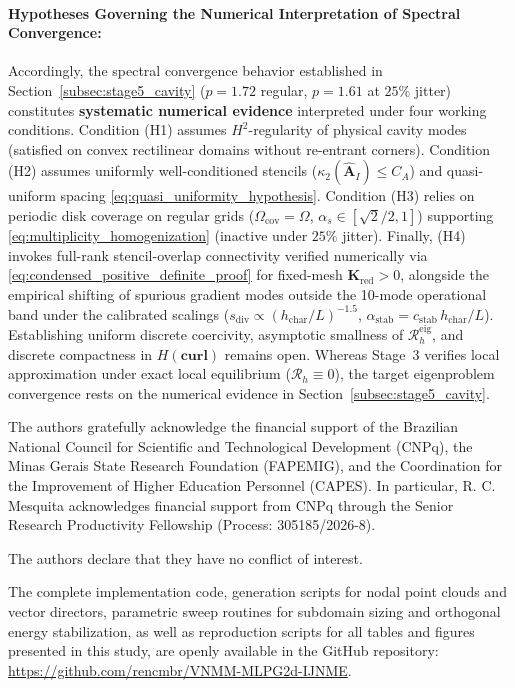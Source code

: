 \documentclass[VANCOUVER]{USG}
\begin{document}
\paragraph*{Hypotheses Governing the Numerical Interpretation of Spectral Convergence:\hspace*{0.35em}}
Accordingly, the spectral convergence behavior established in Section~\ref{subsec:stage5_cavity} ($p = 1.72$ regular, $p = 1.61$ at $25\%$ jitter) constitutes \textbf{systematic numerical evidence} interpreted under four working conditions. Condition (H1) assumes $H^2$-regularity of physical cavity modes (satisfied on convex rectilinear domains without re-entrant corners). Condition (H2) assumes uniformly well-conditioned stencils ($\kappa_2(\widehat{\mathbf{A}}_I) \le C_A$) and quasi-uniform spacing \eqref{eq:quasi_uniformity_hypothesis}. Condition (H3) relies on periodic disk coverage on regular grids ($\Omega_{\mathrm{cov}} = \Omega$, $\alpha_s \in [\sqrt{2}/2, 1]$) supporting \eqref{eq:multiplicity_homogenization} (inactive under $25\%$ jitter). Finally, (H4) invokes full-rank stencil-overlap connectivity verified numerically via \eqref{eq:condensed_positive_definite_proof} for fixed-mesh $\mathbf{K}_{\mathrm{red}} > 0$, alongside the empirical shifting of spurious gradient modes outside the 10-mode operational band under the calibrated scalings ($s_{\mathrm{div}} \propto (h_{\mathrm{char}}/L)^{-1.5}$, $\alpha_{\mathrm{stab}} = c_{\mathrm{stab}}\,h_{\mathrm{char}}/L$). Establishing uniform discrete coercivity, asymptotic smallness of $\mathcal{R}_h^{\mathrm{eig}}$, and discrete compactness in $H(\mathbf{curl})$ \cite{boffi2006finite, boffi2013mixed} remains open. Whereas Stage~3 verifies local approximation under exact local equilibrium ($\mathcal{R}_h \equiv 0$), the target eigenproblem convergence rests on the numerical evidence in Section~\ref{subsec:stage5_cavity}.

The authors gratefully acknowledge the financial support of the Brazilian National Council for Scientific and Technological Development (CNPq), the Minas Gerais State Research Foundation (FAPEMIG), and the Coordination for the Improvement of Higher Education Personnel (CAPES). In particular, R. C. Mesquita acknowledges financial support from CNPq through the Senior Research Productivity Fellowship (Process: 305185/2026-8).

The authors declare that they have no conflict of interest.

The complete implementation code, generation scripts for nodal point clouds and vector directors, parametric sweep routines for subdomain sizing and orthogonal energy stabilization, as well as reproduction scripts for all tables and figures presented in this study, are openly available in the GitHub repository: \url{https://github.com/rencmbr/VNMM-MLPG2d-IJNME}.
\end{document}

